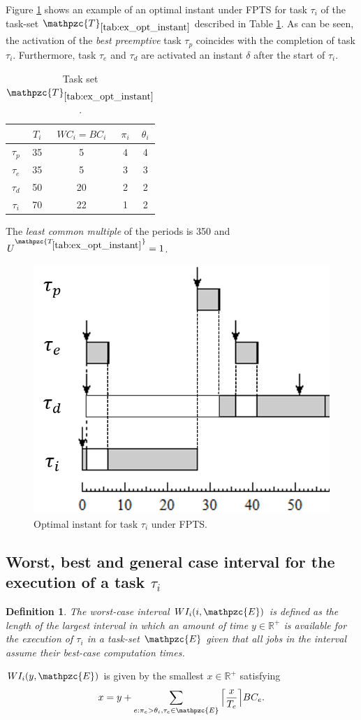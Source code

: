\documentclass[fleqn]{article}
\newtheorem{definition}{Definition}
\begin{document}
Figure \ref{fig:optimal_instant} shows an example of an optimal instant under FPTS for task $\tau_i$ of the task-set $\mathpzc{T}_{\ref{tab:ex_opt_instant}}$ described in Table \ref{tab:ex_opt_instant}. As can be seen, the activation of the \textit{best preemptive} task $\tau_p$ coincides with the completion of task $\tau_i$. Furthermore, task $\tau_e$ and $\tau_d$ are activated an instant $\delta$ after the start of $\tau_i$.

\begin{table}[H]
	\center
	\caption{Task set $\mathpzc{T}_{\ref{tab:ex_opt_instant}}$.}
	\label{tab:ex_opt_instant}
	\begin{tabular}{c c c c c}
		\hline 
		& $T_i$ & $WC_i=BC_i$ & $\pi_i$ & $\theta_i$ \\ 
		\hline 
		$\tau_p$& 35 & 5  & 4 & 4 \\ 
		$\tau_e$& 35 & 5  & 3 & 3 \\ 
		$\tau_d$& 50 & 20 & 2 & 2 \\ 
		$\tau_i$& 70 & 22 & 1 & 2 \\
		\hline 
	\end{tabular}
	\small
	\item The \textit{least common multiple} of the periods is 350 and $U^{\mathpzc{T_{\ref{tab:ex_opt_instant}}}}=1$.
\end{table}

\begin{figure}[H]
	\centering
	\includegraphics[width=0.43\linewidth]{figures/optimal_instant.PNG}
	\caption{Optimal instant for task $\tau_i$ under FPTS. }
	\label{fig:optimal_instant}
\end{figure}

\subsection{Worst, best and general case interval for the execution of a task $\tau_i$}

\begin{definition}
	The \textit{worst-case interval} $WI_i(i,\mathpzc{E})$ is defined as the length of the largest interval in which an amount of time $y \in \mathbb{R}^+$ is available for the execution of $\tau_i$ in a task-set $\mathpzc{E}$ given that all jobs in the interval assume their \textit{best-case computation times}. 
\end{definition}
$WI_i(y,\mathpzc{E})$ is given by the smallest $x \in \mathbb{R}^+$ satisfying
\begin{align}
x = y + \sum\limits_{e:\pi_e > \theta_i, \tau_e \in \mathpzc{E}}\Big\lceil  \dfrac{x}{T_e}\Big\rceil  BC_e.
\end{align}
\end{document}
